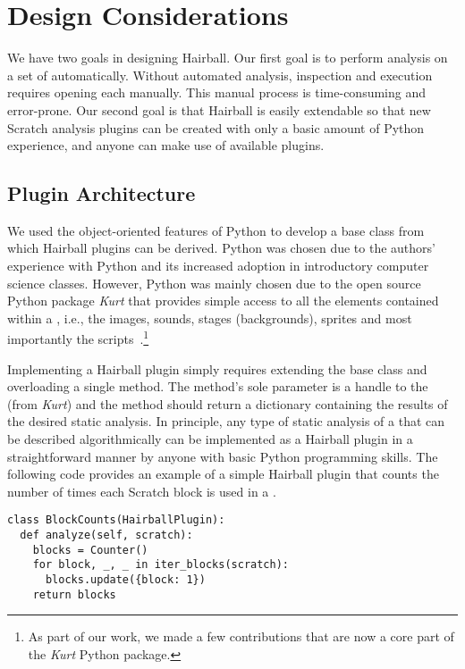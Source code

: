 \section{Design Considerations}

We have two goals in designing Hairball. Our first goal is to perform analysis
on a set of  automatically. Without automated analysis, inspection
and execution requires opening each \sprogram{} manually. This manual process
is time-consuming and error-prone.  Our second goal is that Hairball is easily
extendable so that new Scratch analysis plugins can be created with only a
basic amount of Python experience, and anyone can make use of available
plugins.


\subsection{Plugin Architecture}
We used the object-oriented features of Python to develop a base class from
which Hairball plugins can be derived. Python was chosen due to the authors'
experience with Python and its increased adoption in introductory computer
science classes. However, Python was mainly chosen due to the open source
Python package \emph{Kurt} that provides simple access to all the elements
contained within a \sprogram{}, i.e., the images, sounds, stages (backgrounds),
sprites and most importantly the scripts~\cite{Radvan:2012:Online}.\footnote{As
  part of our work, we made a few contributions that are now a core part of the
  \emph{Kurt} Python package.}

Implementing a Hairball plugin simply requires extending the base class and
overloading a single method. The method's sole parameter is a handle to the
\sprogram{} (from \emph{Kurt}) and the method should return a dictionary
containing the results of the desired static analysis. In principle, any type
of static analysis of a \sprogram{} that can be described algorithmically can
be implemented as a Hairball plugin in a straightforward manner by anyone with
basic Python programming skills. The following code provides an example of a
simple Hairball plugin that counts the number of times each Scratch block is
used in a \sprogram{}.

\begin{verbatim}
class BlockCounts(HairballPlugin):
  def analyze(self, scratch):
    blocks = Counter()
    for block, _, _ in iter_blocks(scratch):
      blocks.update({block: 1})
    return blocks
\end{verbatim}
